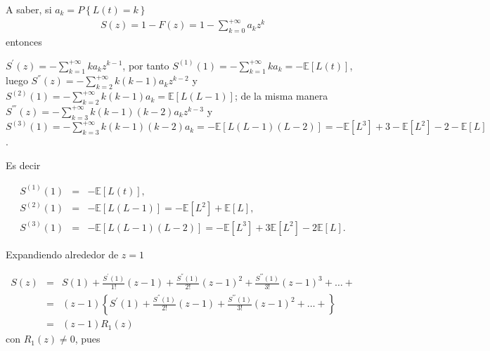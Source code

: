 \documentclass{article}
\newcommand{\esp}{\mathbb{E}}
\begin{document}
A saber, si $a_{k}=P\left\{L\left(t\right)=k\right\}$
\begin{eqnarray*}
S\left(z\right)=1-F\left(z\right)=1-\sum_{k=0}^{+\infty}a_{k}z^{k}
\end{eqnarray*}
entonces


$S^{'}\left(z\right)=-\sum_{k=1}^{+\infty}ka_{k}z^{k-1}$, por tanto $S^{(1)}\left(1\right)=-\sum_{k=1}^{+\infty}ka_{k}=-\esp\left[L\left(t\right)\right]$,
luego $S^{''}\left(z\right)=-\sum_{k=2}^{+\infty}k(k-1)a_{k}z^{k-2}$ y $S^{(2)}\left(1\right)=-\sum_{k=2}^{+\infty}k(k-1)a_{k}=\esp\left[L\left(L-1\right)\right]$;
de la misma manera $S^{'''}\left(z\right)=-\sum_{k=3}^{+\infty}k(k-1)(k-2)a_{k}z^{k-3}$ y $S^{(3)}\left(1\right)=-\sum_{k=3}^{+\infty}k(k-1)(k-2)a_{k}=-\esp\left[L\left(L-1\right)\left(L-2\right)\right]
=-\esp\left[L^{3}\right]+3-\esp\left[L^{2}\right]-2-\esp\left[L\right]$. 

Es decir

\begin{eqnarray*}
S^{(1)}\left(1\right)&=&-\esp\left[L\left(t\right)\right],\\ S^{(2)}\left(1\right)&=&-\esp\left[L\left(L-1\right)\right]
=-\esp\left[L^{2}\right]+\esp\left[L\right],\\
S^{(3)}\left(1\right)&=&-\esp\left[L\left(L-1\right)\left(L-2\right)\right]
=-\esp\left[L^{3}\right]+3\esp\left[L^{2}\right]-2\esp\left[L\right].
\end{eqnarray*}


Expandiendo alrededor de $z=1$

\begin{eqnarray*}
S\left(z\right)&=&S\left(1\right)+\frac{S^{'}\left(1\right)}{1!}\left(z-1\right)+\frac{S^{''}\left(1\right)}{2!}\left(z-1\right)^{2}+\frac{S^{'''}\left(1\right)}{3!}\left(z-1\right)^{3}+\ldots+\\
&=&\left(z-1\right)\left\{S^{'}\left(1\right)+\frac{S^{''}\left(1\right)}{2!}\left(z-1\right)+\frac{S^{'''}\left(1\right)}{3!}\left(z-1\right)^{2}+\ldots+\right\}\\
&=&\left(z-1\right)R_{1}\left(z\right)
\end{eqnarray*}
con $R_{1}\left(z\right)\neq0$, pues
\end{document}
